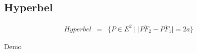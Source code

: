 \subsection{Hyperbel}
\begin{frame}
\begin{figure}[h]
	\centering
		\resizebox{.5\linewidth}{!}{
			
		}
\end{figure}
\begin{displaymath}
	\begin{array}{rcl}
		Hyperbel & = & \{P\in E^2\;|\;|\overline{{PF}_2} - \overline{{PF}_1}| = 2a\}
	\end{array}
\end{displaymath}
\end{frame}
\begin{frame}
\centerline{\huge Demo}
\end{frame}